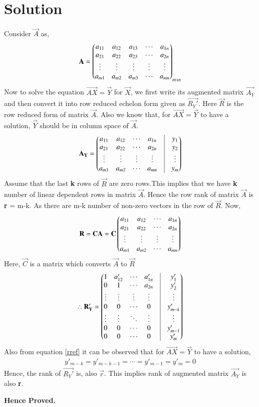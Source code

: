 \documentclass[journal,12pt,twocolumn]{IEEEtran}
\begin{document}
\section{Solution}
Consider $\vec{A}$ as,
\begin{align}
\mathbf{A} = \begin{pmatrix}a_{11}&a_{12}&a_{13}&\cdots&a_{1n}\\a_{21}&a_{22}&a_{23}&\cdots&a_{2n}\\\vdots&\vdots&\vdots&\vdots&\vdots\\a_{m1}&a_{m2}&a_{m3}&\cdots&a_{mn}\end{pmatrix}_{mxn}
\end{align} 
Now to solve the equation $\vec{AX}=\vec{Y}$ for $\vec{X}$, we first write its augmented matrix $\vec{A_Y}$ and then convert it into row reduced echelon form given as $\vec{R_Y'}$. Here $\vec{R}$ is the row reduced form of matrix $\vec{A}$. Also we know that, for $\vec{AX}=\vec{Y}$ to have a solution, $\vec{Y}$ should be in column space of $\vec{A}$.
\begin{align}
\vec{A_Y} = \myvec{a_{11}&a_{12}&\cdots&a_{1n}&\vrule&y_{1} \\a_{21}&a_{22}&\cdots&a_{2n}&\vrule&y_{2}\\\vdots&\vdots&\vdots&\vdots&\vrule&\vdots\\a_{m1}&a_{m2}&\cdots&a_{mn}&\vrule&y_{m}}
\end{align} 
Assume that the last \textbf{k} rows of $\vec{R}$ are zero rows.This implies that we have \textbf{k} number of linear dependent rows in matrix $\vec{A}$. Hence the row rank of matrix $\vec{A}$ is \textbf{r} = m-k. As there are m-k number of non-zero vectors in the row of $\vec{R}$. Now, 
\begin{align}
\mathbf{R} = \mathbf{CA} = \mathbf{C} \begin{pmatrix}a_{11}&a_{12}&\cdots&a_{1n}\\a_{21}&a_{22}&\cdots&a_{2n}\\\vdots&\vdots&\vdots&\vdots\\a_{m1}&a_{m2}&\cdots&a_{mn}\end{pmatrix}
\end{align}
Here, $\vec{C}$ is a matrix which converts $\vec{A}$ to $\vec{R}$ 
\begin{align}
\therefore \vec{R_Y'} = \myvec{1&a'_{12}&\cdots&a'_{1n}&\vrule&y'_{1} \\0&1&\cdots&a_{2n}&\vrule&y'_{2}\\\vdots&\vdots&\vdots&\vdots&\vrule&\vdots\\0&0&\cdots&0&\vrule&y'_{m-k}\\\vdots&\vdots&\ddots&\vdots&\vrule&\vdots\\0&0&\cdots&0&\vrule&y'_{m-1}\\0&0&\cdots&0&\vrule&y'_{m}}\label{rref}
\end{align}
Also from equation \eqref{rref} it can be observed that for   $\vec{AX}=\vec{Y}$ to have a solution,
\begin{align}
y'_{m-k} = y'_{m-k-1} = \cdots = y'_{m-1} = y'_{m} = 0 
\end{align} 
Hence, the rank of $\vec{R_Y'}$ is, also $\vec{r}$. This implies rank of augmented matrix $\vec{A_Y}$ is also \textbf{r}. \\
\centerline{\textbf{Hence Proved.}}
\end{document}

